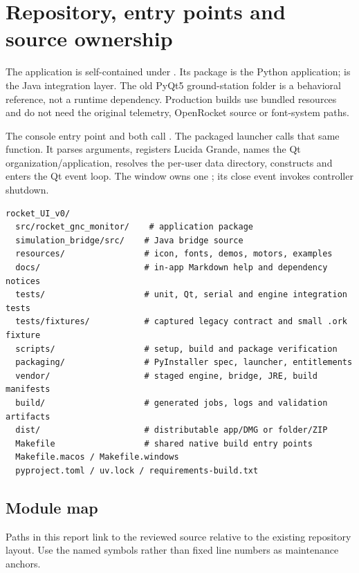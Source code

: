 \section{Repository, entry points and source ownership}\label{sec:repo}
The application is self-contained under . Its
 package is the Python application;
 is the Java integration layer.
The old PyQt5 ground-station folder is a behavioral reference, not a runtime
dependency. Production builds use bundled resources and do not need the original
telemetry, OpenRocket source or font-system paths.

The console entry point  and
 both call .
The packaged launcher calls that same function. It parses arguments, registers
Lucida Grande, names the Qt organization/application, resolves the per-user data
directory, constructs  and enters the Qt event loop.
The window owns one ; its close event invokes controller shutdown.

\begin{lstlisting}
rocket_UI_v0/
  src/rocket_gnc_monitor/    # application package
  simulation_bridge/src/    # Java bridge source
  resources/                # icon, fonts, demos, motors, examples
  docs/                     # in-app Markdown help and dependency notices
  tests/                    # unit, Qt, serial and engine integration tests
  tests/fixtures/           # captured legacy contract and small .ork fixture
  scripts/                  # setup, build and package verification
  packaging/                # PyInstaller spec, launcher, entitlements
  vendor/                   # staged engine, bridge, JRE, build manifests
  build/                    # generated jobs, logs and validation artifacts
  dist/                     # distributable app/DMG or folder/ZIP
  Makefile                  # shared native build entry points
  Makefile.macos / Makefile.windows
  pyproject.toml / uv.lock / requirements-build.txt
\end{lstlisting}

\subsection{Module map}
Paths in this report link to the reviewed source relative to the existing
repository layout. Use the named symbols rather than fixed line numbers as
maintenance anchors.

